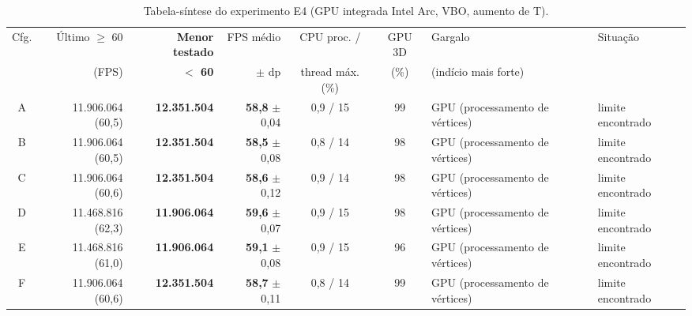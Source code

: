 \begin{table}[H]
\centering
\caption{Tabela-síntese do experimento E4 (GPU integrada Intel Arc, VBO, aumento de T).}
\label{tab:sintese_e4}
\scriptsize
\setlength{\tabcolsep}{3pt}
\begin{tabularx}{\textwidth}{c r r r c c L P{1.6cm}}
\toprule
Cfg. & Último $\geq$ 60 & \textbf{Menor testado} & FPS médio & CPU proc. / & GPU 3D & Gargalo & Situação \\
 & (FPS) & \textbf{$<$ 60} & $\pm$ dp & thread máx. (\%) & (\%) & (indício mais forte) & \\
\midrule
A & 11.906.064 (60,5) & \textbf{12.351.504} & \textbf{58,8} $\pm$ 0,04 & 0,9 / 15 & 99 & GPU (processamento de vértices) & limite encontrado \\
B & 11.906.064 (60,5) & \textbf{12.351.504} & \textbf{58,5} $\pm$ 0,08 & 0,8 / 14 & 98 & GPU (processamento de vértices) & limite encontrado \\
C & 11.906.064 (60,6) & \textbf{12.351.504} & \textbf{58,6} $\pm$ 0,12 & 0,9 / 14 & 98 & GPU (processamento de vértices) & limite encontrado \\
D & 11.468.816 (62,3) & \textbf{11.906.064} & \textbf{59,6} $\pm$ 0,07 & 0,9 / 15 & 98 & GPU (processamento de vértices) & limite encontrado \\
E & 11.468.816 (61,0) & \textbf{11.906.064} & \textbf{59,1} $\pm$ 0,08 & 0,9 / 15 & 96 & GPU (processamento de vértices) & limite encontrado \\
F & 11.906.064 (60,6) & \textbf{12.351.504} & \textbf{58,7} $\pm$ 0,11 & 0,8 / 14 & 99 & GPU (processamento de vértices) & limite encontrado \\
\bottomrule
\end{tabularx}
\end{table}
